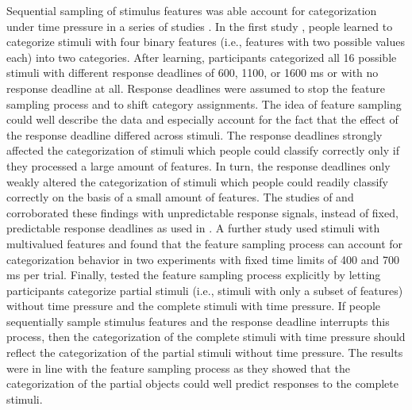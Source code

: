 \documentclass[a4paper,man,natbib]{apa6}
\begin{document}
Sequential sampling of stimulus features was able account for categorization under time pressure in a series of studies \citep{lamberts1995categorization, lamberts1998time, lamberts1999building, lamberts1999categorization, lamberts1997fast}. In the first study \citep{lamberts1995categorization}, people learned to categorize stimuli with four binary features (i.e., features with two possible values each) into two categories. After learning, participants categorized all 16 possible stimuli with different response deadlines of 600, 1100, or 1600 ms or with no response deadline at all. Response deadlines were assumed to stop the feature sampling process and to shift category assignments. The idea of feature sampling could well describe the data and especially account for the fact that the effect of the response deadline differed across stimuli. The response deadlines strongly affected the categorization of stimuli which people could classify correctly only if they processed a large amount of features. In turn, the response deadlines only weakly altered the categorization of stimuli which people could readily classify correctly on the  basis of a small amount of features. The studies of \cite{lamberts1998time} and \cite{lamberts1999categorization} corroborated these findings with unpredictable response signals, instead of fixed, predictable response deadlines as used in \cite{lamberts1995categorization}. A further study \citep{lamberts1997fast} used stimuli with multivalued features and found that the feature sampling process can account for categorization behavior in two experiments with fixed time limits of 400 and 700 ms per trial. Finally, \cite{lamberts1999building} tested the feature sampling process explicitly by letting participants categorize partial stimuli (i.e., stimuli with only a subset of features) without time pressure and the complete stimuli with time pressure. If people sequentially sample stimulus features and the response deadline interrupts this process, then the categorization of the complete stimuli with time pressure should reflect the categorization of the partial stimuli without time pressure. The results were in line with the feature sampling process as they showed that the categorization of the partial objects could well predict responses to the complete stimuli.
\end{document}
